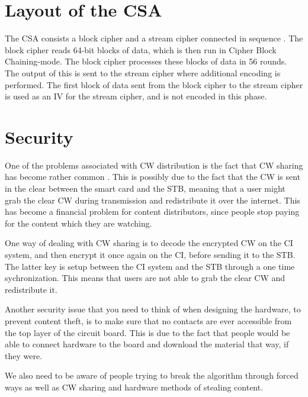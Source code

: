 \section{Layout of the CSA}
The CSA consists a block cipher and a stream cipher connected in sequence 
\citep[p. 271]{WeiLi:2007}. The block cipher reads 64-bit blocks of data, which 
is then run in Cipher Block Chaining-mode. The block cipher processes these 
blocks of data in 56 rounds. The output of this is sent to the stream cipher 
where additional encoding is performed. The first block of data sent from the 
block cipher to the stream cipher is used as an IV for the stream cipher, and is 
not encoded in this phase. \citep{DVBAnalysis:2006}

\section{Security}
One of the problems associated with CW distribution is the fact that CW sharing 
has become rather common \citep{Farncombe}. This is possibly due to the fact that
the CW is sent in the clear between the smart card and the STB, meaning that a 
user might grab the clear CW during transmission and redistribute it over the 
internet. This has become a financial problem for content distributors, since 
people stop paying for the content which they are watching.

One way of dealing with CW sharing is to decode the encrypted CW on the CI 
system, and then encrypt it once again on the CI, before sending it to the STB. 
The latter key is setup between the CI system and the STB  through a one time
sychronization. This means that users are not able to grab the clear CW and 
redistribute it. \citep[pp. 12--13]{HIS:2011}

Another security issue that you need to think of when designing the hardware, to 
prevent content theft, is to make sure that no contacts are ever accessible from 
the top layer of the circuit board. This is due to the fact that people would be 
able to connect hardware to the board and download the material that way, if they
were. 

We also need to be aware of people trying to break the algorithm through forced 
ways as well as CW sharing and hardware methods of stealing content.

